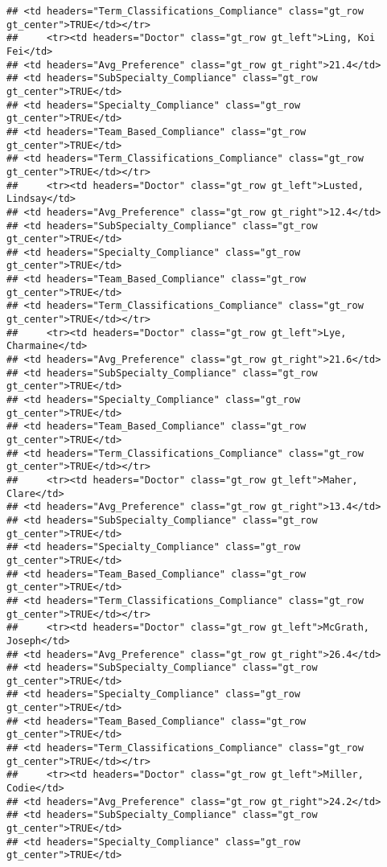 \documentclass[
]{article}
\begin{document}
\begin{verbatim}
## <td headers="Term_Classifications_Compliance" class="gt_row gt_center">TRUE</td></tr>
##     <tr><td headers="Doctor" class="gt_row gt_left">Ling, Koi Fei</td>
## <td headers="Avg_Preference" class="gt_row gt_right">21.4</td>
## <td headers="SubSpecialty_Compliance" class="gt_row gt_center">TRUE</td>
## <td headers="Specialty_Compliance" class="gt_row gt_center">TRUE</td>
## <td headers="Team_Based_Compliance" class="gt_row gt_center">TRUE</td>
## <td headers="Term_Classifications_Compliance" class="gt_row gt_center">TRUE</td></tr>
##     <tr><td headers="Doctor" class="gt_row gt_left">Lusted, Lindsay</td>
## <td headers="Avg_Preference" class="gt_row gt_right">12.4</td>
## <td headers="SubSpecialty_Compliance" class="gt_row gt_center">TRUE</td>
## <td headers="Specialty_Compliance" class="gt_row gt_center">TRUE</td>
## <td headers="Team_Based_Compliance" class="gt_row gt_center">TRUE</td>
## <td headers="Term_Classifications_Compliance" class="gt_row gt_center">TRUE</td></tr>
##     <tr><td headers="Doctor" class="gt_row gt_left">Lye, Charmaine</td>
## <td headers="Avg_Preference" class="gt_row gt_right">21.6</td>
## <td headers="SubSpecialty_Compliance" class="gt_row gt_center">TRUE</td>
## <td headers="Specialty_Compliance" class="gt_row gt_center">TRUE</td>
## <td headers="Team_Based_Compliance" class="gt_row gt_center">TRUE</td>
## <td headers="Term_Classifications_Compliance" class="gt_row gt_center">TRUE</td></tr>
##     <tr><td headers="Doctor" class="gt_row gt_left">Maher, Clare</td>
## <td headers="Avg_Preference" class="gt_row gt_right">13.4</td>
## <td headers="SubSpecialty_Compliance" class="gt_row gt_center">TRUE</td>
## <td headers="Specialty_Compliance" class="gt_row gt_center">TRUE</td>
## <td headers="Team_Based_Compliance" class="gt_row gt_center">TRUE</td>
## <td headers="Term_Classifications_Compliance" class="gt_row gt_center">TRUE</td></tr>
##     <tr><td headers="Doctor" class="gt_row gt_left">McGrath, Joseph</td>
## <td headers="Avg_Preference" class="gt_row gt_right">26.4</td>
## <td headers="SubSpecialty_Compliance" class="gt_row gt_center">TRUE</td>
## <td headers="Specialty_Compliance" class="gt_row gt_center">TRUE</td>
## <td headers="Team_Based_Compliance" class="gt_row gt_center">TRUE</td>
## <td headers="Term_Classifications_Compliance" class="gt_row gt_center">TRUE</td></tr>
##     <tr><td headers="Doctor" class="gt_row gt_left">Miller, Codie</td>
## <td headers="Avg_Preference" class="gt_row gt_right">24.2</td>
## <td headers="SubSpecialty_Compliance" class="gt_row gt_center">TRUE</td>
## <td headers="Specialty_Compliance" class="gt_row gt_center">TRUE</td>

\end{verbatim}
\end{document}
